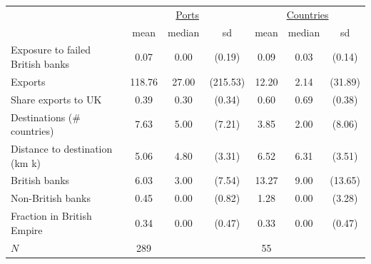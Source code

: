 {
\def\sym#1{\ifmmode^{#1}\else\(^{#1}\)\fi}
\begin{tabular}{l*{2}{ccc}}
\toprule
            &\multicolumn{3}{c}{\underline{Ports}} &\multicolumn{3}{c}{\underline{Countries}}\\
            &        mean&      median&          sd&        mean&      median&          sd\\
\midrule
Exposure to failed British banks&        0.07&        0.00&      (0.19)&        0.09&        0.03&      (0.14)\\
Exports     &      118.76&       27.00&    (215.53)&       12.20&        2.14&     (31.89)\\
Share exports to UK&        0.39&        0.30&      (0.34)&        0.60&        0.69&      (0.38)\\
Destinations (\# countries)&        7.63&        5.00&      (7.21)&        3.85&        2.00&      (8.06)\\
Distance to destination (km k)&        5.06&        4.80&      (3.31)&        6.52&        6.31&      (3.51)\\
British banks&        6.03&        3.00&      (7.54)&       13.27&        9.00&     (13.65)\\
Non-British banks&        0.45&        0.00&      (0.82)&        1.28&        0.00&      (3.28)\\
Fraction in British Empire&        0.34&        0.00&      (0.47)&        0.33&        0.00&      (0.47)\\
\midrule
\(N\)       &         289&            &            &          55&            &            \\
\bottomrule
\end{tabular}
}
